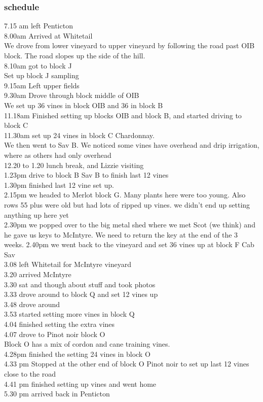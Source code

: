 \documentclass[11pt,letter]{article}
\newenvironment{smitemize}{
\begin{itemize}
  \setlength{\itemsep}{0pt}
  \setlength{\parskip}{0.8pt}
  \setlength{\parsep}{0pt}}
{\end{itemize}
}
\begin{document}
\begin{smitemize}
\subsubsection {schedule}
7.15 am left Penticton \\
8.00am Arrived at Whitetail \\
We drove from lower vineyard to upper vineyard by following the road past OIB block. The road slopes up the side of the hill. \\
8.10am got to block J \\
Set up block J sampling \\
9.15am Left upper fields \\
9.30am Drove through block middle of OIB \\
We set up 36 vines in block OIB and 36 in block B \\
11.18am Finished setting up blocks OIB and block B, and started driving to block C \\ 
11.30am set up 24 vines in block C Chardonnay. \\
We then went to Sav B. We noticed some vines have overhead and drip irrigation, where as others had only overhead \\
12.20 to 1.20 lunch break, and Lizzie visiting \\
1.23pm  drive to block B Sav B to finish last 12 vines \\
1.30pm finished last 12 vine set up. \\
2.15pm we headed to Merlot block G. Many plants here were too young. Also rows 55 plus were old but had lots of ripped up vines. we didn't end up setting anything up here yet \\
2.30pm we popped over to the big metal shed where we met Scot (we think) and he gave us keys to McIntyre. We need to return the key at the end of the 3 weeks. 
2.40pm we went back to the vineyard and set 36 vines up at block F Cab Sav \\
3.08 left Whitetail for McIntyre vineyard \\
3.20 arrived McIntyre \\
3.30 sat and though about stuff and took photos \\
3.33 drove around to block Q and set 12 vines up\\
3.48 drove around \\
3.53 started setting more vines in block Q \\ 
4.04 finished setting the extra vines \\
4.07 drove to Pinot noir block O \\
Block O has a mix of cordon and cane training vines. \\
4.28pm finished the setting 24 vines in block O\\
4.33 pm Stopped at the other end of block O Pinot noir to set up last 12 vines close to the road\\
4.41 pm finished setting up vines and went home \\
5.30 pm arrived back in Penticton \\

\end{smitemize}
\end{document}

